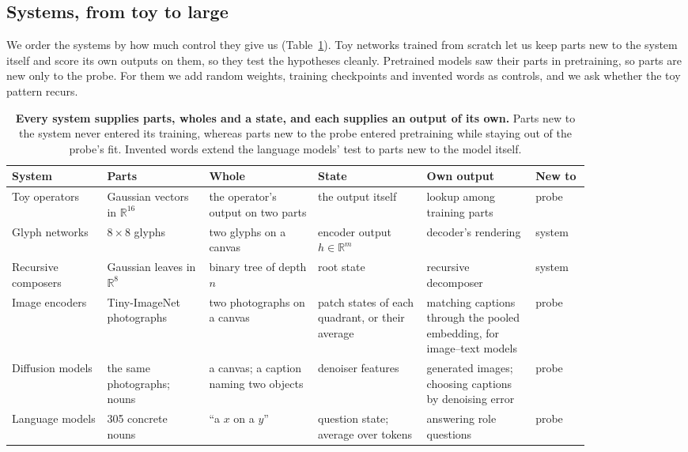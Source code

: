 \documentclass[10pt]{article}
\theoremstyle{plain}
\theoremstyle{remark}
\newcommand{\R}{\mathbb{R}}
\begin{document}
\subsection{Systems, from toy to large}

We order the systems by how much control they give us (Table~\ref{tab:systems}). Toy networks trained from scratch let us keep parts new to the system itself and score its own outputs on them, so they test the hypotheses cleanly. Pretrained models saw their parts in pretraining, so parts are new only to the probe. For them we add random weights, training checkpoints and invented words as controls, and we ask whether the toy pattern recurs.

\begin{table}[t]
  \centering
  \small
  \caption{\textbf{Every system supplies parts, wholes and a state, and each supplies an output of its own.} Parts new to the system never entered its training, whereas parts new to the probe entered pretraining while staying out of the probe's fit. Invented words extend the language models' test to parts new to the model itself.}
  \label{tab:systems}
  \begin{tabular}{@{}p{0.14\linewidth}p{0.15\linewidth}p{0.16\linewidth}p{0.16\linewidth}p{0.16\linewidth}p{0.08\linewidth}@{}}
    \toprule
    System & Parts & Whole & State & Own output & New to \\
    \midrule
    Toy operators & Gaussian vectors in $\R^{16}$ & the operator's output on two parts & the output itself & lookup among training parts & probe \\
    Glyph networks & $8 \times 8$ glyphs & two glyphs on a canvas & encoder output $h \in \R^m$ & decoder's rendering & system \\
    Recursive composers & Gaussian leaves in $\R^8$ & binary tree of depth $n$ & root state & recursive decomposer & system \\
    Image encoders & Tiny-ImageNet photographs & two photographs on a canvas & patch states of each quadrant, or their average & matching captions through the pooled embedding, for image--text models & probe \\
    Diffusion models & the same photographs; nouns & a canvas; a caption naming two objects & denoiser features & generated images; choosing captions by denoising error & probe \\
    Language models & 305 concrete nouns & ``a $x$ on a $y$'' & question state; average over tokens & answering role questions & probe \\
    \bottomrule
  \end{tabular}
\end{table}
\end{document}
